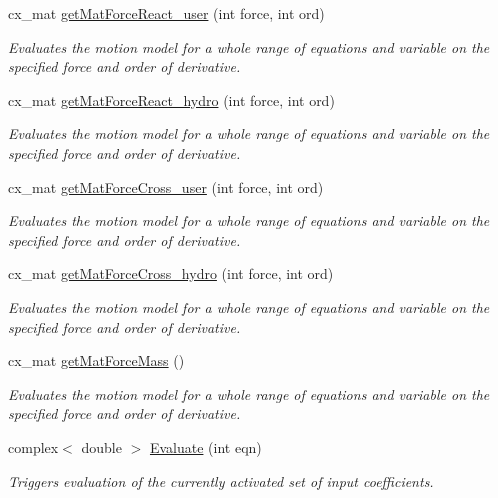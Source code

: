 \begin{DoxyCompactItemize}
cx\-\_\-mat \hyperlink{classmotion_model_ab66bbe5be7a30911e27f6dcbe1cc5692}{get\-Mat\-Force\-React\-\_\-user} (int force, int ord)
\begin{DoxyCompactList}\small\item\em Evaluates the motion model for a whole range of equations and variable on the specified force and order of derivative. \end{DoxyCompactList}\item 
cx\-\_\-mat \hyperlink{classmotion_model_acf9c7d3bdef62599e407e6a6b525d40c}{get\-Mat\-Force\-React\-\_\-hydro} (int force, int ord)
\begin{DoxyCompactList}\small\item\em Evaluates the motion model for a whole range of equations and variable on the specified force and order of derivative. \end{DoxyCompactList}\item 
cx\-\_\-mat \hyperlink{classmotion_model_a328df6db2f443730041c499a9fb71aa1}{get\-Mat\-Force\-Cross\-\_\-user} (int force, int ord)
\begin{DoxyCompactList}\small\item\em Evaluates the motion model for a whole range of equations and variable on the specified force and order of derivative. \end{DoxyCompactList}\item 
cx\-\_\-mat \hyperlink{classmotion_model_ae867b9e0cfa210a66f4f44fb1a2980e7}{get\-Mat\-Force\-Cross\-\_\-hydro} (int force, int ord)
\begin{DoxyCompactList}\small\item\em Evaluates the motion model for a whole range of equations and variable on the specified force and order of derivative. \end{DoxyCompactList}\item 
cx\-\_\-mat \hyperlink{classmotion_model_a46d7c9d0648f72d948c02c9e871d98fc}{get\-Mat\-Force\-Mass} ()
\begin{DoxyCompactList}\small\item\em Evaluates the motion model for a whole range of equations and variable on the specified force and order of derivative. \end{DoxyCompactList}\item 
complex$<$ double $>$ \hyperlink{classmotion_model_a42986c7385b52b79629e86bd85c6a6e9}{Evaluate} (int eqn)
\begin{DoxyCompactList}\small\item\em Triggers evaluation of the currently activated set of input coefficients. \end{DoxyCompactList}\item 

\end{DoxyCompactItemize}
